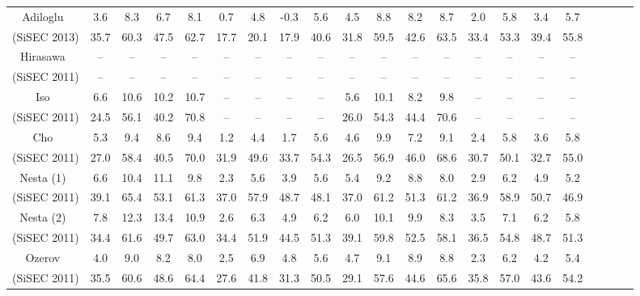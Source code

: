 \documentclass{article}
\begin{document}
\begin{table*}[t]
\begin{center}
{\begin{tabular}{|c|cccc|cccc|cccc|cccc|cccc|}
			\multirow{1}{*}{Adiloglu~\cite{Adiloglu}}		&	3.6	&	8.3	&	6.7	&	8.1			&	0.7	&	4.8	&	-0.3	&	5.6			&	4.5	&	8.8	&	8.2	&	8.7		&	2.0	&	5.8	&	3.4	&	5.7	\\
			\multirow{1}{*}{(SiSEC 2013)}			&	35.7	&	60.3	&	47.5	&	62.7			&	17.7	&	20.1	&	17.9	&	40.6			&	31.8	&	59.5	&	42.6	&	63.5		&	33.4	&	53.3	&	39.4	&	55.8	\\ \hline
			\multirow{1}{*}{Hirasawa~\cite{Hirasawa}}	&	--	&	--	&	--	&	--			&	--	&	--	&	--	&	--			&	--	&	--	&	--	&	--		&	--	&	--	&	--	&	--	\\
			\multirow{1}{*}{(SiSEC 2011)}			&	--	&	--	&	--	&	--			&	--	&	--	&	--	&	--			&	--	&	--	&	--	&	--		&	--	&	--	&	--	&	--	\\ \hline
			\multirow{1}{*}{Iso~\cite{Iso}}				&	6.6	&	10.6	&	10.2	&	10.7			&	--	&	--	&	--	&	--			&	5.6	&	10.1	&	8.2	&	9.8		&	--	&	--	&	--	&	--	\\
			\multirow{1}{*}{(SiSEC 2011)}			&	24.5	&	56.1	&	40.2	&	70.8			&	--	&	--	&	--	&	--			&	26.0	&	54.3	&	44.4	&	70.6		&	--	&	--	&	--	&	--	\\ \hline
			\multirow{1}{*}{Cho~\cite{Cho2}}			&	5.3	&	9.4	&	8.6	&	9.4			&	1.2	&	4.4	&	1.7	&	5.6			&	4.6	&	9.9	&	7.2	&	9.1		&	2.4	&	5.8	&	3.6	&	5.8	\\
			\multirow{1}{*}{(SiSEC 2011)}			&	27.0	&	58.4	&	40.5	&	70.0			&	31.9	&	49.6	&	33.7	&	54.3			&	26.5	&	56.9	&	46.0	&	68.6		&	30.7	&	50.1	&	32.7	&	55.0	\\ \hline
			\multirow{1}{*}{Nesta (1)~\cite{Nesta}}	&	6.6	&	10.4	&	11.1	&	9.8			&	2.3	&	5.6	&	3.9	&	5.6			&	5.4	&	9.2	&	8.8	&	8.0		&	2.9	&	6.2	&	4.9	&	5.2	\\
			\multirow{1}{*}{(SiSEC 2011)}			&	39.1	&	65.4	&	53.1	&	61.3			&	37.0	&	57.9	&	48.7	&	48.1			&	37.0	&	61.2	&	51.3	&	61.2		&	36.9	&	58.9	&	50.7	&	46.9	\\ \hline
			\multirow{1}{*}{Nesta (2)~\cite{Nesta}}	&	7.8	&	12.3	&	13.4	&	10.9			&	2.6	&	6.3	&	4.9	&	6.2			&	6.0	&	10.1	&	9.9	&	8.3		&	3.5	&	7.1	&	6.2	&	5.8	\\
			\multirow{1}{*}{(SiSEC 2011)}			&	34.4	&	61.6	&	49.7	&	63.0			&	34.4	&	51.9	&	44.5	&	51.3			&	39.1	&	59.8	&	52.5	&	58.1		&	36.5	&	54.8	&	48.7	&	51.3	\\ \hline
			\multirow{1}{*}{Ozerov~\cite{Ozerov}}		&	4.0	&	9.0	&	8.2	&	8.0			&	2.5	&	6.9	&	4.8	&	5.6			&	4.7	&	9.1	&	8.9	&	8.8		&	2.3	&	6.2	&	4.2	&	5.4	\\
			\multirow{1}{*}{(SiSEC 2011)}			&	35.5	&	60.6	&	48.6	&	64.4			&	27.6	&	41.8	&	31.3	&	50.5			&	29.1	&	57.6	&	44.6	&	65.6		&	35.8	&	57.0	&	43.6	&	54.2	\\ \hline
		\end{tabular}
	}
	\end{center}
	\label{UND-test-250ms-5cm}
\end{table*}
\end{document}
